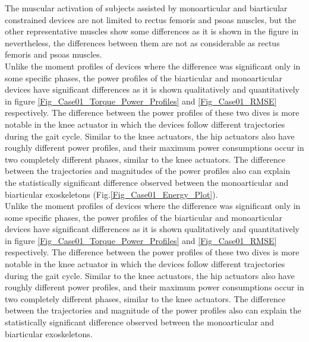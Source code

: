 \documentclass[10pt,letterpaper]{article}
\begin{document}
The muscular activation of subjects assisted by monoarticular and biarticular constrained devices are not limited to rectus femoris and psoas muscles, but the other representative muscles show some differences as it is shown in the figure in  nevertheless, the differences between them are not as considerable as rectus femoris and psoas muscles.\\
Unlike the moment profiles of devices where the difference was significant only in some specific phases, the power profiles of the biarticular and monoarticular devices have significant differences as it is shown qualitatively and quantitatively in figure \ref{Fig_Case01_Torque_Power_Profiles} and \ref{Fig_Case01_RMSE} respectively. The difference between the power profiles of these two dives is more notable in the knee actuator in which the devices follow different trajectories during the gait cycle. Similar to the knee actuators, the hip actuators also have roughly different power profiles, and their maximum power consumptions occur in two completely different phases, similar to the knee actuators.  The difference between the trajectories and magnitudes of the power profiles also can explain the statistically significant difference observed between the monoarticular and biarticular exoskeletons (Fig.\ref{Fig_Case01_Energy_Plot}).\\
Unlike the moment profiles of devices where the difference was significant only in some specific phases, the power profiles of the biarticular and monoarticular devices have significant differences as it is shown qualitatively and quantitatively in figure \ref{Fig_Case01_Torque_Power_Profiles} and \ref{Fig_Case01_RMSE} respectively. The difference between the power profiles of these two dives is more notable in the knee actuator in which the devices follow different trajectories during the gait cycle. Similar to the knee actuators, the hip actuators also have roughly different power profiles, and their maximum power consumptions occur in two completely different phases, similar to the knee actuators.  The difference between the trajectories and magnitude of the power profiles also can explain the statistically significant difference observed between the monoarticular and biarticular exoskeletons.\\
\end{document}
